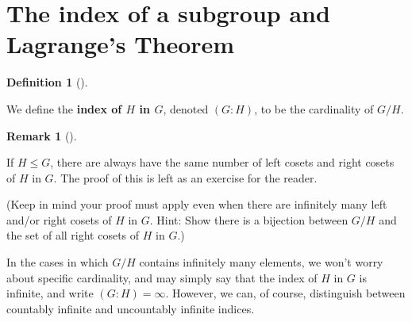 \documentclass[10pt,]{book}
\newcommand{\terminology}[1]{\textbf{#1}}
\theoremstyle{plain}
\theoremstyle{definition}
\newtheorem{definition}[theorem]{Definition}
\theoremstyle{definition}
\newtheorem{remark}[theorem]{Remark}
\theoremstyle{definition}
\theoremstyle{definition}
\numberwithin{equation}{section}
\begin{document}
\section[{The index of a subgroup and Lagrange's Theorem}]{The index of a subgroup and Lagrange's Theorem}\label{section-24}
\begin{definition}[{}]\label{definition-62}

        We define the \terminology{index of \(H\) in \(G\)}, denoted \((G:H)\),
        to be the cardinality of \(G/H\).%
\label{notation-71}
\end{definition}
\begin{remark}[]\label{remark-41}

If \(H\leq G\), there are always have the same number of left cosets and right cosets of \(H\) in \(G\).  The proof of this is left as an exercise for the reader.%
\par
 (Keep in mind your proof must apply even when there are infinitely many left and/or right cosets of \(H\) in \(G\).  Hint: Show there is a bijection between \(G/H\) and the set of all right cosets of \(H\) in \(G\).)%
\end{remark}
In the cases in which \(G/H\) contains infinitely many elements, we won't worry about specific cardinality, and may simply say that the index of \(H\) in \(G\) is infinite, and write \((G:H)=\infty\). However, we can, of course, distinguish between countably infinite and uncountably infinite indices.%
\par
\end{document}
